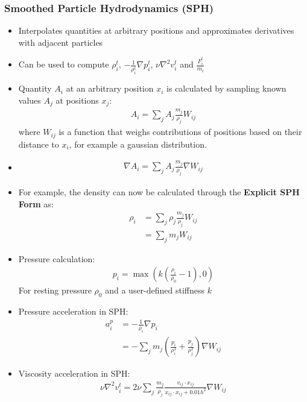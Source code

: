 \documentclass{scrartcl}
\begin{document}
\subsubsection*{Smoothed Particle Hydrodynamics (SPH)}
\begin{itemize}
    \item Interpolates quantities at arbitrary positions and approximates derivatives with adjacent particles
    \item Can be used to compute $\rho_i^t$, $-\frac{1}{\rho_i^t}\nabla p_i^t$, $\nu\nabla^2 v_i^t$ and $\frac{F_i^t}{m_i}$
    \item Quantity $A_i$ at an arbitrary position $x_i$ is calculated by sampling known values $A_j$ at positions $x_j$:
    \begin{align*}
        A_i = \sum_j A_j \frac{m_j}{\rho_j}W_{ij}
    \end{align*}
    where $W_{ij}$ is a function that weighs contributions of positions based on their distance to $x_i$, for example a gaussian distribution.
    \item 
    \begin{align*}
        \nabla A_i = \sum_j A_j \frac{m_j}{\rho_j}\nabla W_{ij}
    \end{align*}
    \item For example, the density can now be calculated through the \textbf{Explicit SPH Form} as:
    \begin{align*}
        \rho_i &= \sum_j \rho_j \frac{m_j}{\rho_j}W_{ij}\\
        &= \sum_j m_jW_{ij}
    \end{align*}
    \item Pressure calculation:
    \begin{align*}
        p_i = \max\left(k\left(\frac{\rho_i}{\rho_0} -1\right), 0\right)
    \end{align*}
    For resting pressure $\rho_0$ and a user-defined stiffness $k$
    \item Pressure acceleration in SPH:
    \begin{align*}
       a_i^p &= -\frac{1}{\rho_i}\nabla p_i\\
       &= -\sum_j m_j \left(\frac{p_i}{\rho_i^2}+\frac{p_j}{\rho_j^2}\right)\nabla W_{ij}
    \end{align*}
    \item Viscosity acceleration in SPH:
    \begin{align*}
        \nu\nabla^2 v_i^t = 2\nu\sum_j \frac{m_j}{\rho_j} \frac{v_{ij} \cdot x_{ij}}{x_{ij} \cdot x_{ij} + 0.01h^2} \nabla W_{ij}
    \end{align*}
\end{itemize}
\end{document}
